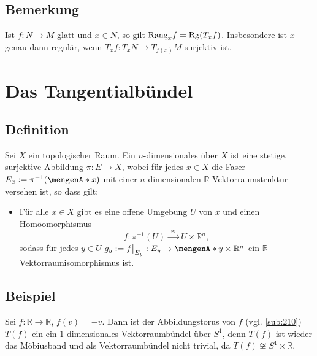 
\subsection{Bemerkung} %
\label{sub:1814}
Ist $f : N \to M$ glatt und $x \in N$, so gilt $\mathrm{Rang}_x f = \Rg \enbrace*{T_x f}$. Insbesondere ist $x$ genau dann regulär, wenn $T_x f : T_x N \to T_{f(x)} M$
surjektiv ist.
\newpage

\section{Das Tangentialbündel} %
\label{sec:19}

\subsection[Definition: Vektorraumbündel]{Definition} %
\label{sub:191}
Sei $X$ ein topologischer Raum. Ein $n$-dimensionales  über $X$ ist eine stetige, surjektive Abbildung $\pi  : E \to X$, wobei für jedes 
$x \in X$ die Faser $E_x := \pi ^{-1} (\set{x})$ mit einer $n$-dimensionalen $\mathds{R}$-Vektorraumstruktur versehen ist, so dass gilt: 
\begin{itemize}[$(\star)$]
	\item Für alle $x \in X$ gibt es eine offene Umgebung $U$ von $x$ und einen Homöomorphismus 
	\[
		f : \pi ^{-1}(U) \xrightarrow{\enspace\approx \enspace} U \times \mathds{R}^n, 
	\]
	sodass für jedes $y \in U$ $g_y := f \big|_{E_y} : E_y  \to \set{y} \times \mathds{R}^n $ ein $\mathds{R}$-Vektorraumisomorphismus ist.
\end{itemize}

\subsection[Beispiel: Abbildungstorus als Möbiusband]{Beispiel} %
\label{sub:192}
Sei $f : \mathds{R} \to \mathds{R}$, $f(v)=-v$. Dann ist der Abbildungstorus von $f$ (vgl. \ref{sub:210}) $T(f)$ ein ein $1$-dimensionales Vektorraumbündel über $S^1$, denn
$T(f)$ ist wieder das Möbiusband und als Vektorraumbündel nicht trivial, da $T(f) \not\cong S^1 \times \mathds{R}$.

